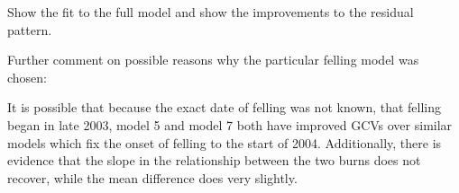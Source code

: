 Show the fit to the full model and show the improvements to the residual pattern.  

Further comment on possible reasons why the particular felling model was chosen:  

It is possible that because the exact date of felling was not known, that felling began in late 2003, model 5 and model 7 both have improved GCVs  over similar models which fix the onset of felling to the start of 2004.  Additionally, there is evidence that the slope in the relationship between the two burns does not recover, while the mean difference does very slightly.







